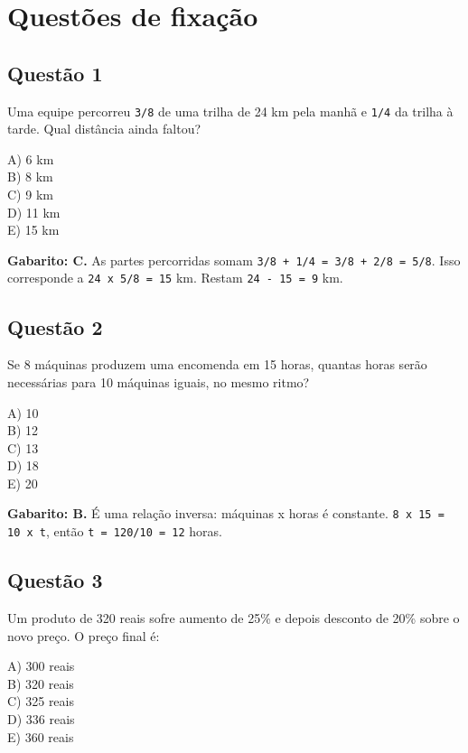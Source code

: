 \documentclass[11pt,a4paper]{article}
\begin{document}
\section*{Questões de fixação}

\subsection*{Questão 1}

Uma equipe percorreu \texttt{3/8} de uma trilha de 24 km pela manhã e \texttt{1/4} da trilha à tarde. Qual distância ainda faltou?

A) 6 km \\ B) 8 km \\ C) 9 km \\ D) 11 km \\ E) 15 km

\begin{alerta}
\textbf{Gabarito: C.} As partes percorridas somam \texttt{3/8 + 1/4 = 3/8 + 2/8 = 5/8}. Isso corresponde a \texttt{24 x 5/8 = 15} km. Restam \texttt{24 - 15 = 9} km.
\end{alerta}

\subsection*{Questão 2}

Se 8 máquinas produzem uma encomenda em 15 horas, quantas horas serão necessárias para 10 máquinas iguais, no mesmo ritmo?

A) 10 \\ B) 12 \\ C) 13 \\ D) 18 \\ E) 20

\begin{alerta}
\textbf{Gabarito: B.} É uma relação inversa: máquinas x horas é constante. \texttt{8 x 15 = 10 x t}, então \texttt{t = 120/10 = 12} horas.
\end{alerta}

\subsection*{Questão 3}

Um produto de 320 reais sofre aumento de 25\% e depois desconto de 20\% sobre o novo preço. O preço final é:

A) 300 reais \\ B) 320 reais \\ C) 325 reais \\ D) 336 reais \\ E) 360 reais
\end{document}
